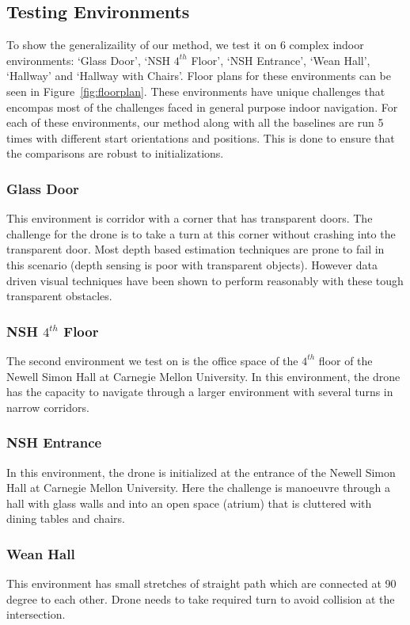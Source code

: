 \documentclass[letterpaper, 10 pt, conference]{ieeeconf}  %
\begin{document}
\subsection{Testing Environments}
To show the generalizaility of our method, we test it on 6 complex indoor environments: `Glass Door', `NSH $4^{th}$ Floor', `NSH Entrance', `Wean Hall', `Hallway' and `Hallway with Chairs'. Floor plans for these environments can be seen in Figure~\ref{fig:floorplan}. These environments have unique challenges that encompas most of the challenges faced in general purpose indoor navigation. For each of these environments, our method along with all the baselines are run 5 times with different start orientations and positions. This is done to ensure that the comparisons are robust to initializations.

\subsubsection{Glass Door}
 This environment is corridor with a corner that has transparent doors. The challenge for the drone is to take a turn at this corner without crashing into the transparent door. Most depth based estimation techniques are prone to fail in this scenario (depth sensing is poor with transparent objects). However data driven visual techniques have been shown to perform reasonably with these tough transparent obstacles.
 
\subsubsection{NSH $4^{th}$ Floor}
The second environment we test on is the office space of the $4^{th}$ floor of the Newell Simon Hall at Carnegie Mellon University. In this environment, the drone has the capacity to navigate through a larger environment with several turns in narrow corridors.

\subsubsection{NSH Entrance}
In this environment, the drone is initialized at the entrance of the Newell Simon Hall at Carnegie Mellon University. Here the challenge is manoeuvre through a hall with glass walls and into an open space (atrium) that is cluttered with dining tables and chairs. 

\subsubsection{Wean Hall}
This environment has small stretches of straight path which are connected at 90 degree to each other. Drone needs to take  required turn to avoid collision at the intersection.
\end{document}
